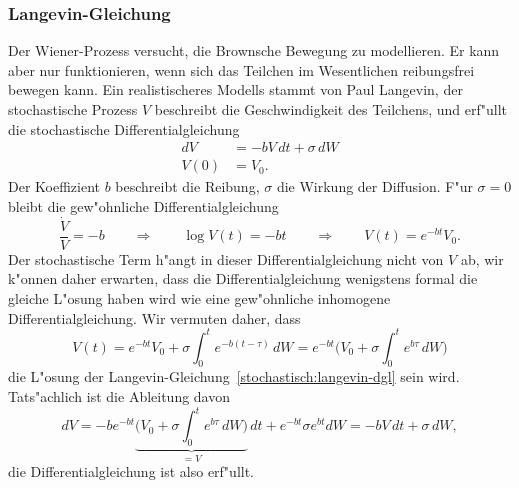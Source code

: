 \subsubsection{Langevin-Gleichung}
Der Wiener-Prozess versucht, die Brownsche Bewegung zu modellieren.
Er kann aber nur funktionieren, wenn sich das Teilchen im Wesentlichen
reibungsfrei bewegen kann.
Ein realistischeres Modells stammt von Paul Langevin, der stochastische 
Prozess $V$ beschreibt die Geschwindigkeit des Teilchens, und erf"ullt
die stochastische Differentialgleichung
\begin{equation}
\begin{aligned}
dV&=-bV\,dt+\sigma\,dW\\
V(0)&=V_0.
\end{aligned}
\label{stochastisch:langevin-dgl}
\end{equation}
Der Koeffizient $b$ beschreibt die Reibung, $\sigma$ die Wirkung der
Diffusion.
F"ur $\sigma=0$ bleibt die gew"ohnliche Differentialgleichung
\[
\frac{\dot V}{V}=-b
\qquad\Rightarrow\qquad
\log V(t)=-bt
\qquad\Rightarrow\qquad
V(t)=e^{-bt}V_0.
\]
Der stochastische Term h"angt in dieser Differentialgleichung nicht von $V$
ab, wir k"onnen daher erwarten, dass die Differentialgleichung wenigstens
formal die gleiche L"osung haben wird wie eine gew"ohnliche
inhomogene Differentialgleichung.
Wir vermuten daher, dass
\begin{equation}
V(t)
=
e^{-bt}V_0 + \sigma\int_0^te^{-b(t-\tau)}\,dW
=
e^{-bt}\biggl(V_0 + \sigma\int_0^te^{b\tau}\,dW\biggr)
\label{stochastisch:langevin-lsg}
\end{equation}
die L"osung der Langevin-Gleichung~\eqref{stochastisch:langevin-dgl}
sein wird.
Tats"achlich ist die Ableitung davon
\[
dV
=
-be^{-bt}
\underbrace{\biggl(V_0 + \sigma\int_0^te^{b\tau}\,dW\biggr)}_{\textstyle =V}\,dt
+
e^{-bt}
\sigma e^{bt}dW
=
-bV\,dt +\sigma\,dW,
\]
die Differentialgleichung ist also erf"ullt.

